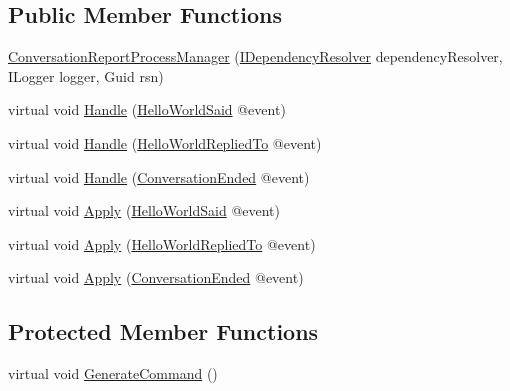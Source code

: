 \subsection*{Public Member Functions}
\begin{DoxyCompactItemize}
\item 
\hyperlink{classCqrs_1_1Akka_1_1Tests_1_1Unit_1_1Sagas_1_1ConversationReportProcessManager_a646ce30aa269388c16820418c5b3f63c}{Conversation\+Report\+Process\+Manager} (\hyperlink{interfaceCqrs_1_1Configuration_1_1IDependencyResolver}{I\+Dependency\+Resolver} dependency\+Resolver, I\+Logger logger, Guid rsn)
\item 
virtual void \hyperlink{classCqrs_1_1Akka_1_1Tests_1_1Unit_1_1Sagas_1_1ConversationReportProcessManager_a282356c4090cfaf2dcfa93916b8b8997}{Handle} (\hyperlink{classCqrs_1_1Akka_1_1Tests_1_1Unit_1_1Events_1_1HelloWorldSaid}{Hello\+World\+Said} @event)
\item 
virtual void \hyperlink{classCqrs_1_1Akka_1_1Tests_1_1Unit_1_1Sagas_1_1ConversationReportProcessManager_a4c98fb5ce16b16e709c31c2fb2eff575}{Handle} (\hyperlink{classCqrs_1_1Akka_1_1Tests_1_1Unit_1_1Events_1_1HelloWorldRepliedTo}{Hello\+World\+Replied\+To} @event)
\item 
virtual void \hyperlink{classCqrs_1_1Akka_1_1Tests_1_1Unit_1_1Sagas_1_1ConversationReportProcessManager_a2980f91992185b3275ba36e97e5eed48}{Handle} (\hyperlink{classCqrs_1_1Akka_1_1Tests_1_1Unit_1_1Events_1_1ConversationEnded}{Conversation\+Ended} @event)
\item 
virtual void \hyperlink{classCqrs_1_1Akka_1_1Tests_1_1Unit_1_1Sagas_1_1ConversationReportProcessManager_a19573bf2840357a4e79f310c3fdfe916}{Apply} (\hyperlink{classCqrs_1_1Akka_1_1Tests_1_1Unit_1_1Events_1_1HelloWorldSaid}{Hello\+World\+Said} @event)
\item 
virtual void \hyperlink{classCqrs_1_1Akka_1_1Tests_1_1Unit_1_1Sagas_1_1ConversationReportProcessManager_a938040ac51a3deb02ae36adb7f5999fb}{Apply} (\hyperlink{classCqrs_1_1Akka_1_1Tests_1_1Unit_1_1Events_1_1HelloWorldRepliedTo}{Hello\+World\+Replied\+To} @event)
\item 
virtual void \hyperlink{classCqrs_1_1Akka_1_1Tests_1_1Unit_1_1Sagas_1_1ConversationReportProcessManager_ae2c1edeb1a4d604948b4c70b71c20555}{Apply} (\hyperlink{classCqrs_1_1Akka_1_1Tests_1_1Unit_1_1Events_1_1ConversationEnded}{Conversation\+Ended} @event)
\end{DoxyCompactItemize}
\subsection*{Protected Member Functions}
\begin{DoxyCompactItemize}
\item 
virtual void \hyperlink{classCqrs_1_1Akka_1_1Tests_1_1Unit_1_1Sagas_1_1ConversationReportProcessManager_a0c10a4f4b6eae7a1c5b321a07b02a1d1}{Generate\+Command} ()
\end{DoxyCompactItemize}
